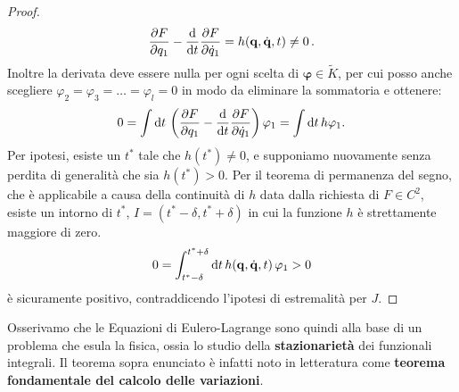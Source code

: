\begin{proof}
    \begin{equation}
        \frac{\partial F}{\partial q_1}- \frac{\mathrm{d}}{\mathrm{d}t} \frac{\partial F}{\partial \dot{q}_1}=h(\mathbf{q},\dot{\mathbf{q}},t)\neq0\,.
    \end{equation}
    Inoltre la derivata deve essere nulla per ogni scelta di $\boldsymbol{\varphi}\in \tilde{K}$, per cui posso anche scegliere $\varphi_2=\varphi_3=\dots=\varphi_l=0$ in modo da eliminare la sommatoria e ottenere:
    \begin{equation}
         0=\int\mathrm{d} t\,\left(\frac{\partial F}{\partial q_1}- \frac{\mathrm{d}}{\mathrm{d}t} \frac{\partial F}{\partial \dot{q}_1}\right)\varphi_1=\int \mathrm{d} t\, h\varphi_1.
    \end{equation}
    Per ipotesi, esiste un $t^*$ tale che $h(t^*)\neq0$, e supponiamo nuovamente senza perdita di generalità che sia $h(t^*)>0$. Per il teorema di permanenza del segno, che è applicabile a causa della continuità di $h$ data dalla richiesta di $F\in C^2$, esiste un intorno di $t^*$, $I=(t^*-\delta,t^*+\delta)$ in cui la funzione $h$ è strettamente maggiore di zero. 
    \begin{equation}
        0=\int_{t^*-\delta}^{t^*+\delta} \mathrm{d} t\,h(\mathbf{q}, \dot{\mathbf{q}}, t)\,\varphi_1>0
    \end{equation}
    è sicuramente positivo, contraddicendo l'ipotesi di estremalità per $J$.
    \end{proof}
   Osserivamo che le Equazioni di Eulero-Lagrange sono quindi alla base di un problema che esula la fisica, ossia lo studio della \textbf{stazionarietà} dei funzionali integrali. Il teorema sopra enunciato è infatti noto in letteratura come \textbf{teorema fondamentale del calcolo delle variazioni}. 
